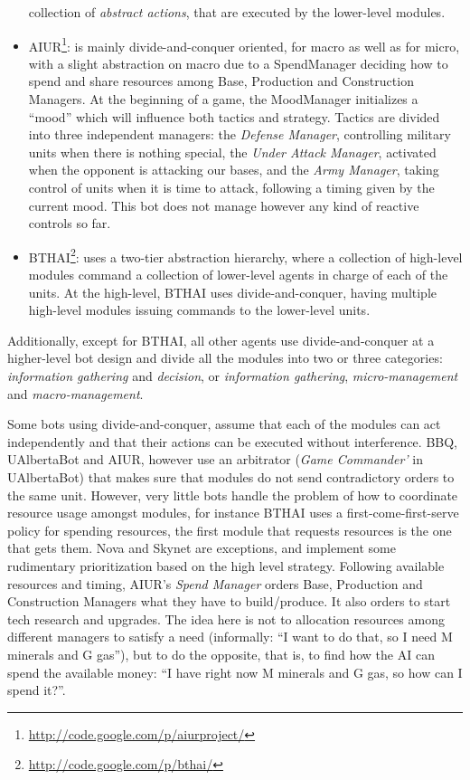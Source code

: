 \documentclass[journal]{IEEEtran}
\begin{document}
\begin{itemize}
  collection  of {\em  abstract  actions}, that  are  executed by  the
  lower-level modules.
\item  AIUR\footnote{\url{http://code.google.com/p/aiurproject/}}:  is
  mainly divide-and-conquer oriented, for  macro as well as for micro,
  with a  slight abstraction on  macro due to a  SpendManager deciding
  how  to  spend  and  share  resources  among  Base,  Production  and
  Construction Managers.  At the beginning of a  game, the MoodManager
  initializes  a  ``mood''  which  will  influence  both  tactics  and
  strategy. Tactics  are divided into three  independent managers: the
  {\em  Defense Manager},  controlling  military units  when there  is
  nothing special, the {\em  Under Attack Manager}, activated when the
  opponent is attacking our bases,  and the {\em Army Manager}, taking
  control of units when it is time to attack, following a timing given
  by the  current mood. This bot  does not manage however  any kind of
  reactive controls so far.
\item  BTHAI\footnote{\url{http://code.google.com/p/bthai/}}:  uses  a
  two-tier  abstraction hierarchy,  where a  collection  of high-level
  modules command a collection of lower-level agents in charge of each
  of  the units.  At  the high-level,  BTHAI uses  divide-and-conquer,
  having   multiple  high-level  modules   issuing  commands   to  the
  lower-level units.
\end{itemize}

Additionally, except for BTHAI, all other agents use divide-and-conquer at a higher-level bot design and divide all the modules into two or three categories: {\em information gathering} and {\em decision}, or {\em information gathering}, {\em micro-management} and {\em macro-management}.

Some bots  using divide-and-conquer, assume  that each of  the modules
can act independently  and that their actions can  be executed without
interference.  BBQ,  UAlbertaBot and  AIUR, however use  an arbitrator
({\em Game Commander'} in UAlbertaBot) that makes sure that modules do
not send contradictory orders to  the same unit.  However, very little
bots handle  the problem of  how to coordinate resource  usage amongst
modules, for  instance BTHAI uses a  first-come-first-serve policy for
spending resources,  the first module  that requests resources  is the
one that gets them. Nova and Skynet are exceptions, and implement some
rudimentary prioritization based on the high level strategy. Following
available  resources and  timing,  AIUR's {\em  Spend Manager}  orders
Base,  Production   and  Construction  Managers  what   they  have  to
build/produce. It also orders to start tech research and upgrades. The
idea here is  not to allocation resources among  different managers to
satisfy a need (informally: ``I want  to do that, so I need M minerals
and G gas''), but to do the  opposite, that is, to find how the AI can
spend the available money: ``I have right now M minerals and G gas, so
how can I spend it?''.
\end{document}
